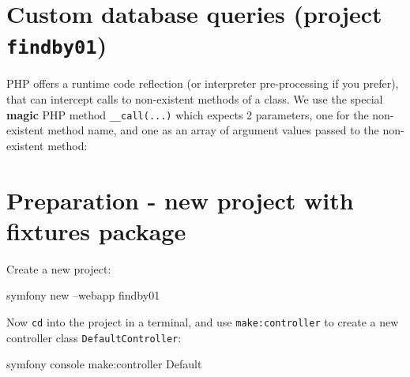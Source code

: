 \documentclass[a4paperpaper,openright]{book}
\newenvironment{Shaded}{}{}
\newcommand{\ExtensionTok}[1]{#1}
\newcommand{\FunctionTok}[1]{\textcolor[rgb]{0.02,0.16,0.49}{#1}}
\newcommand{\KeywordTok}[1]{\textcolor[rgb]{0.00,0.44,0.13}{\textbf{#1}}}
\newcommand{\NormalTok}[1]{#1}
\newcommand{\OtherTok}[1]{\textcolor[rgb]{0.00,0.44,0.13}{#1}}
\newcommand{\StringTok}[1]{\textcolor[rgb]{0.25,0.44,0.63}{#1}}
\begin{document}
\hypertarget{custom-database-queries-project-findby01}{%
\section{\texorpdfstring{Custom database queries (project
\texttt{findby01})}{Custom database queries (project findby01)}}\label{custom-database-queries-project-findby01}}

PHP offers a runtime code reflection (or interpreter pre-processing if
you prefer), that can intercept calls to non-existent methods of a
class. We use the special \textbf{magic} PHP method
\texttt{\_\_call(...)} which expects 2 parameters, one for the
non-existent method name, and one as an array of argument values passed
to the non-existent method:

\begin{Shaded}
\end{Shaded}

\hypertarget{preparation---new-project-with-fixtures-package-2}{%
\section{Preparation - new project with fixtures
package}\label{preparation---new-project-with-fixtures-package-2}}

Create a new project:

\begin{Shaded}
\begin{Highlighting}[]
     \ExtensionTok{symfony}\NormalTok{ new --webapp findby01}
\end{Highlighting}
\end{Shaded}

Now \texttt{cd} into the project in a terminal, and use
\texttt{make:controller} to create a new controller class
\texttt{DefaultController}:

\begin{Shaded}
\begin{Highlighting}[]
     \ExtensionTok{symfony}\NormalTok{ console make:controller Default}
\end{Highlighting}
\end{Shaded}
\end{document}
